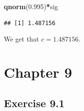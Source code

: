 \documentclass[
]{krantz}
\makeatletter
\newenvironment{Shaded}{\begin{snugshade}}{\end{snugshade}}
\newcommand{\FloatTok}[1]{\textcolor[rgb]{0.00,0.00,0.81}{#1}}
\newcommand{\KeywordTok}[1]{\textcolor[rgb]{0.13,0.29,0.53}{\textbf{#1}}}
\newcommand{\NormalTok}[1]{#1}
\newcommand{\OperatorTok}[1]{\textcolor[rgb]{0.81,0.36,0.00}{\textbf{#1}}}
\newenvironment{kframe}{%
\medskip{}
\setlength{\fboxsep}{.8em}
 \def\at@end@of@kframe{}%
 \ifinner\ifhmode%
  \def\at@end@of@kframe{\end{minipage}}%
  \begin{minipage}{\columnwidth}%
 \fi\fi%
 \def\FrameCommand##1{\hskip\@totalleftmargin \hskip-\fboxsep
 \colorbox{shadecolor}{##1}\hskip-\fboxsep
     \hskip-\linewidth \hskip-\@totalleftmargin \hskip\columnwidth}%
 \MakeFramed {\advance\hsize-\width
   \@totalleftmargin\z@ \linewidth\hsize
   \@setminipage}}%
 {\par\unskip\endMakeFramed%
 \at@end@of@kframe}
\renewenvironment{Shaded}{\begin{kframe}}{\end{kframe}}
\theoremstyle{definition}
\theoremstyle{definition}
\theoremstyle{definition}
\theoremstyle{remark}
\makeatother
\begin{document}
\begin{enumerate}
\begin{Shaded}
\begin{Highlighting}[]
\KeywordTok{qnorm}\NormalTok{(}\FloatTok{0.995}\NormalTok{)}\OperatorTok{*}\NormalTok{sig}
\end{Highlighting}
\end{Shaded}

\begin{verbatim}
## [1] 1.487156
\end{verbatim}

  We get that \(c=1.487156\).
\end{enumerate}

\hypertarget{chapter-9}{%
\section*{Chapter 9}\label{chapter-9}}


\hypertarget{exercise-9.1}{%
\subsection*{Exercise 9.1}\label{exercise-9.1}}
\end{document}
